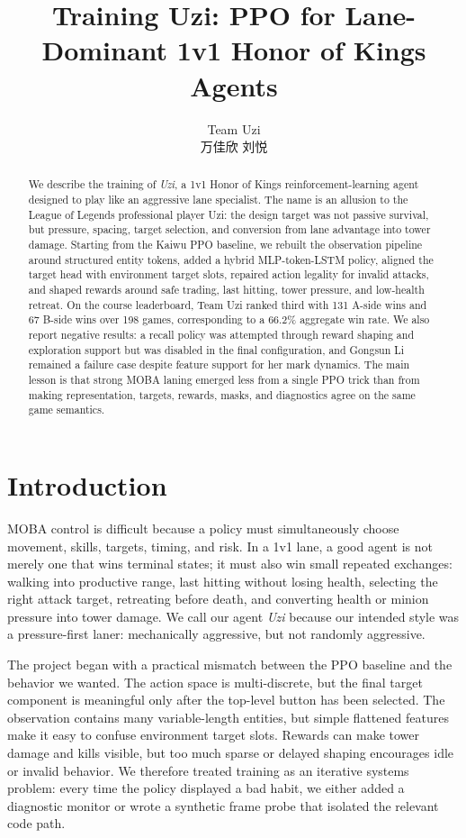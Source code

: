 \documentclass{article}
\title{Training Uzi: PPO for Lane-Dominant 1v1 Honor of Kings Agents}
\author{%
  Team Uzi\\
  万佳欣\enspace 253108030048 \quad 刘悦\enspace 253108030049\\
}
\begin{document}
\maketitle

\begin{abstract}
We describe the training of \emph{Uzi}, a 1v1 Honor of Kings reinforcement-learning agent designed to play like an aggressive lane specialist. The name is an allusion to the League of Legends professional player Uzi: the design target was not passive survival, but pressure, spacing, target selection, and conversion from lane advantage into tower damage. Starting from the Kaiwu PPO baseline, we rebuilt the observation pipeline around structured entity tokens, added a hybrid MLP-token-LSTM policy, aligned the target head with environment target slots, repaired action legality for invalid attacks, and shaped rewards around safe trading, last hitting, tower pressure, and low-health retreat. On the course leaderboard, Team Uzi ranked third with 131 A-side wins and 67 B-side wins over 198 games, corresponding to a 66.2\% aggregate win rate. We also report negative results: a recall policy was attempted through reward shaping and exploration support but was disabled in the final configuration, and Gongsun Li remained a failure case despite feature support for her mark dynamics. The main lesson is that strong MOBA laning emerged less from a single PPO trick than from making representation, targets, rewards, masks, and diagnostics agree on the same game semantics.
\end{abstract}

\section{Introduction}

MOBA control is difficult because a policy must simultaneously choose movement, skills, targets, timing, and risk. In a 1v1 lane, a good agent is not merely one that wins terminal states; it must also win small repeated exchanges: walking into productive range, last hitting without losing health, selecting the right attack target, retreating before death, and converting health or minion pressure into tower damage. We call our agent \emph{Uzi} because our intended style was a pressure-first laner: mechanically aggressive, but not randomly aggressive.

The project began with a practical mismatch between the PPO baseline and the behavior we wanted. The action space is multi-discrete, but the final target component is meaningful only after the top-level button has been selected. The observation contains many variable-length entities, but simple flattened features make it easy to confuse environment target slots. Rewards can make tower damage and kills visible, but too much sparse or delayed shaping encourages idle or invalid behavior. We therefore treated training as an iterative systems problem: every time the policy displayed a bad habit, we either added a diagnostic monitor or wrote a synthetic frame probe that isolated the relevant code path.
\end{document}

